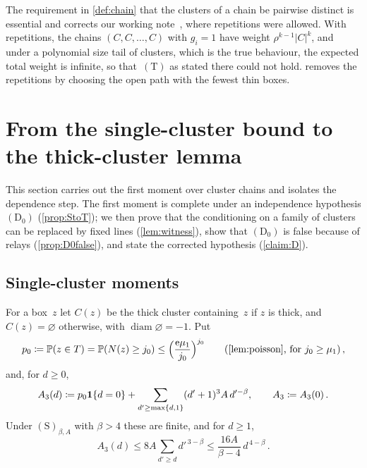 \documentclass[11pt,letterpaper]{article}
\DeclareMathOperator{\diam}{diam}
\begin{document}
\begin{remark}
\label{rem:distinct}
The requirement in \cref{def:chain} that the clusters of a chain be pairwise distinct is essential and corrects our working note~\cite{FM26}, where repetitions were allowed. With repetitions, the chains $(C,C,\dots,C)$ with $g_i=1$ have weight $\rho^{k-1}\lvert C\rvert^k$, and under a polynomial size tail of clusters, which is the true behaviour, the expected total weight is infinite, so that~$\mathrm{(T)}$ as stated there could not hold.  removes the repetitions by choosing the open path with the fewest thin boxes.
\end{remark}

\section{From the single-cluster bound to the thick-cluster lemma}
\label{sec:StoT}

This section carries out the first moment over cluster chains and isolates the dependence step. The first moment is complete under an independence hypothesis $\mathrm{(D_0)}$ (\cref{prop:StoT}); we then prove that the conditioning on a family of clusters can be replaced by fixed lines (\cref{lem:witness}), show that $\mathrm{(D_0)}$ is false because of relays (\cref{prop:D0false}), and state the corrected hypothesis (\cref{claim:D}).

\subsection{Single-cluster moments}

For a box~$z$ let $C(z)$ be the thick cluster containing~$z$ if $z$ is thick, and $C(z)=\varnothing$ otherwise, with $\diam\varnothing=-1$. Put
\begin{equation}
\label{eq:p0}
  p_0\coloneqq\P(z\in T)=\P(N(z)\ge j_0)\le\Bigl(\frac{\e\mu_1}{j_0}\Bigr)^{j_0}\qquad(\text{\cref{lem:poisson}, for }j_0\ge\mu_1)\,,
\end{equation}
and, for $d\ge0$,
\begin{equation}
\label{eq:Aq}
  A_3(d)\coloneqq p_0\mathbf{1}\{d=0\}+\sum_{d'\ge\max\{d,1\}}(d'+1)^3A\,d'^{-\beta},\qquad A_3\coloneqq A_3(0)\,.
\end{equation}
Under $\mathrm{(S)}_{\beta,A}$ with $\beta>4$ these are finite, and for $d\ge1$,
\begin{equation}
\label{eq:Aqtail}
  A_3(d)\le8A\sum_{d'\ge d}d'^{\,3-\beta}\le\frac{16A}{\beta-4}\,d^{\,4-\beta}\,.
\end{equation}
\end{document}

